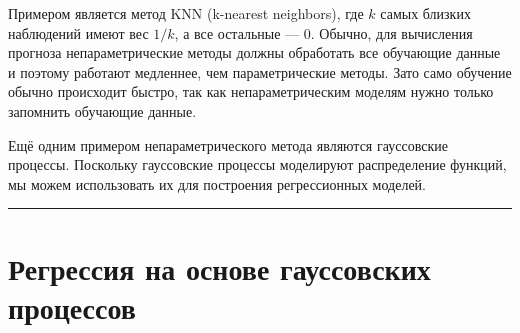 \documentclass[11pt,a4paper]{article}
\begin{document}
    \begin{center}
    \end{center}

    \begin{center}
    \end{center}

    \begin{center}
    \end{center}

    \begin{center}
    \end{center}

    Примером является метод KNN (k-nearest neighbors), где \(k\) самых
близких наблюдений имеют вес \(1/k\), а все остальные --- \(0\). Обычно,
для вычисления прогноза непараметрические методы должны обработать все
обучающие данные и поэтому работают медленнее, чем параметрические
методы. Зато само обучение обычно происходит быстро, так как
непараметрическим моделям нужно только запомнить обучающие данные.

Ещё одним примером непараметрического метода являются гауссовские
процессы. Поскольку гауссовские процессы моделируют распределение
функций, мы можем использовать их для построения регрессионных моделей.

    \begin{center}\rule{0.5\linewidth}{0.5pt}\end{center}

    \hypertarget{ux440ux435ux433ux440ux435ux441ux441ux438ux44f-ux43dux430-ux43eux441ux43dux43eux432ux435-ux433ux430ux443ux441ux441ux43eux432ux441ux43aux438ux445-ux43fux440ux43eux446ux435ux441ux441ux43eux432}{%
\section{Регрессия на основе гауссовских
процессов}\label{ux440ux435ux433ux440ux435ux441ux441ux438ux44f-ux43dux430-ux43eux441ux43dux43eux432ux435-ux433ux430ux443ux441ux441ux43eux432ux441ux43aux438ux445-ux43fux440ux43eux446ux435ux441ux441ux43eux432}}
\end{document}
